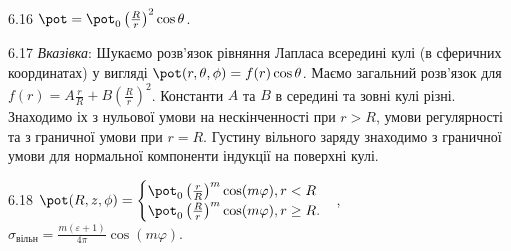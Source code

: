 \begin{Solution}{6.{16}}
	$\pot = \pot_0 \left( \frac{R}{r}\right)^2\cos\theta $.
\end{Solution}
\begin{Solution}{6.{17}}
	\emph{Вказівка}: Шукаємо розв’язок рівняння Лапласа всередині кулі (в сферичних координатах)  у вигляді $\pot(r,\theta,\phi) = f(r)\cos\theta$. Маємо загальний розв'язок для  $f(r) = A\frac{r}{R} + B\left( \frac{R}{r}\right)^2$.  Константи $A$ та $B$ в середині та зовні кулі різні. Знаходимо іх з нульової умови на нескінченності при $r>R$, умови регулярності та з граничної умови при  $r = R$. Густину вільного заряду знаходимо з граничної умови для нормальної компоненти індукції на поверхні кулі.
\end{Solution}
\begin{Solution}{6.{18}}
	\(
		\pot(R,z,\phi) =
		\begin{cases}
			\pot _0\left( \frac{r}{R} \right)^m\cos (m\varphi), r < R \\
			\pot _0\left( \frac{R}{r} \right)^m\cos (m\varphi), r \ge R.
		\end{cases}
	\),
	\(
		\sigma_\text{вільн} = \frac{m(\varepsilon  + 1)}{4\pi }\cos (m\varphi ).
	\)
\end{Solution}
